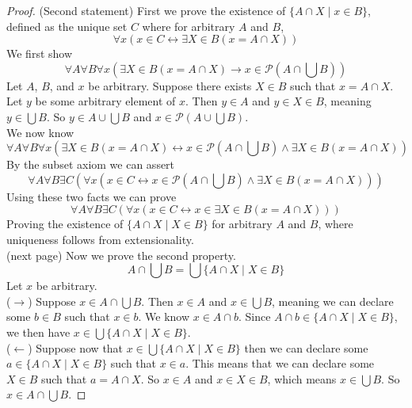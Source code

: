 \documentclass{report}
\begin{document}
\begin{proof}(Second statement) First we prove the existence of $\{A\cap X\mid x\in B\}$, defined as the unique set $C$ where for arbitrary $A$ and $B$,
\begin{equation*}
\forall x(x\in C\leftrightarrow\exists X\in B(x=A\cap X))
\end{equation*}
We first show
\begin{equation*}
\forall A\forall B\forall x(\exists X\in B(x=A\cap X)\to x\in\mathscr P(A\cap\bigcup B))
\end{equation*}
Let $A$, $B$, and $x$ be arbitrary. Suppose there exists $X\in B$ such that $x=A\cap X$.
Let $y$ be some arbitrary element of $x$. Then $y\in A$ and $y\in X\in B$, meaning $y\in\bigcup B$.
So $y\in A\cup\bigcup B$ and $x\in\mathscr P(A\cup\bigcup B)$.\\
\indent We now know
\begin{equation*}
\forall A\forall B\forall x(\exists X\in B(x=A\cap X)\leftrightarrow x\in\mathscr P(A\cap\bigcup B)\land\exists X\in B(x=A\cap X))
\end{equation*}
By the subset axiom we can assert
\begin{equation*}
\forall A\forall B\exists C(\forall x(x\in C\leftrightarrow x\in\mathscr P(A\cap\bigcup B)\land\exists X\in B(x=A\cap X)))
\end{equation*}
Using these two facts we can prove
\begin{equation*}
\forall A\forall B\exists C(\forall x(x\in C\leftrightarrow x\in\exists X\in B(x=A\cap X)))
\end{equation*}
Proving the existence of $\{A\cap X\mid X\in B\}$ for arbitrary $A$ and $B$, where uniqueness follows from extensionality.\\
(next page)\newpage
Now we prove the second property.
\begin{equation*}
A\cap\bigcup B=\bigcup\{A\cap X\mid X\in B\}
\end{equation*}
Let $x$ be arbitrary.\\
\indent($\rightarrow$) Suppose $x\in A\cap\bigcup B$. Then $x\in A$ and $x\in\bigcup B$, meaning we can declare some $b\in B$ such that $x\in b$. We know $x\in A\cap b$. 
Since $A\cap b\in\{A\cap X\mid X\in B\}$, we then have $x\in\bigcup\{A\cap X\mid X\in B\}$.\\
\indent($\leftarrow$) Suppose now that $x\in\bigcup\{A\cap X\mid X\in B\}$ then we can declare some $a\in\{A\cap X\mid X\in B\}$ such that $x\in a$. This means that 
we can declare some $X\in B$ such that $a=A\cap X$. So $x\in A$ and $x\in X\in B$, which means
$x\in\bigcup B$. So $x\in A\cap\bigcup B$.
\end{proof}
\end{document}
